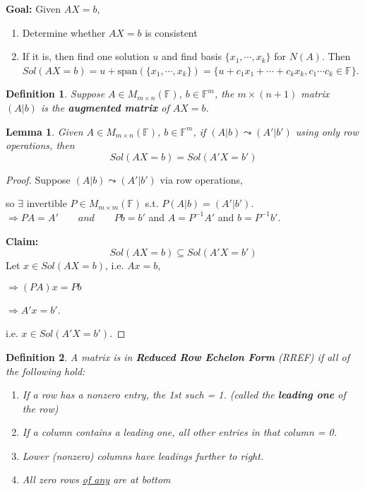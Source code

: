\documentclass[12pt]{article}
\theoremstyle{plain}
\newtheorem{definition}{Definition}[subsection]
\newtheorem{lemma}{Lemma}[subsection]
\newcommand{\Span}{\mathrm{span}}
\newcommand{\mF}{{\mathbb{F}}}
\begin{document}
\textbf{Goal:} Given $AX = b$, 
\begin{enumerate}
	\item Determine whether $AX = b$ is consistent
	\item If it is, then find one solution $u$ and find basis 
		$\{x_1, \cdots, x_k\}$ for $N(A)$.
		Then $Sol(AX = b) = u + \Span(\{x_1, \cdots, x_k\}) = \{u + c_1x_1 +
		\cdots + c_kx_k, c_1\cdots c_k \in \mF\}$. \\
\end{enumerate}

\begin{definition}
	Suppose $A \in M_{m\times n}(\mF)$, $b \in \mF^m$, the $m\times(n+1)$
	matrix $(A|b)$ is the \textbf{augmented matrix} of $AX = b$. \\
\end{definition}

\begin{lemma}
	Given $A \in M_{m\times n} (\mF)$, $b \in \mF^m$, if $(A|b) \leadsto
	(A'|b')$ using only row operations, then 
	\[
		Sol(AX = b) = Sol(A'X = b')
	\]
\end{lemma}
\begin{proof}
	Suppose $(A|b)\leadsto (A'|b')$ via row operations, 
	
	so $\exists$ invertible $P \in M_{m\times m}(\mF)$ s.t. $P(A|b) = (A'|b')$. 
	$\Rightarrow PA = A' \qquad and \qquad Pb = b'$
	and $A = P^{-1}A'$ and $b = P^{-1}b'$. 

	\textbf{Claim: }
	\[
		Sol(AX = b) \subseteq Sol(A'X = b')
	\]
	Let $x \in Sol(AX = b)$, i.e. $Ax = b$,

	$\Rightarrow (PA)x = Pb$ 

	$\Rightarrow A'x = b'$. 

	i.e. $x \in Sol(A'X = b')$. 
\end{proof}

\begin{definition}
	A matrix is in \textbf{Reduced Row Echelon Form} (RREF) if all of the 
	following hold: 
	\begin{enumerate}
		\item If a row has a nonzero entry, the 1st such = 1. (called 
			the \textbf{leading one} of the row)
		\item If a column contains a leading one, all other entries
			in that column = 0. 
		\item Lower (nonzero) columns have leadings further to right. 
		\item All zero rows \underline{of any} are at bottom
	\end{enumerate}
\end{definition}
\end{document}
